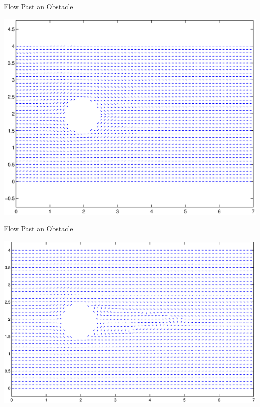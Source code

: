 \documentclass[frames]{prosper}
\begin{document}
\begin{slide}[Dissolve]{Flow Past an Obstacle}
\begin{center}
\includegraphics[scale = .4]{circle}
\end{center}
\end{slide}

\begin{slide}[Dissolve]{Flow Past an Obstacle}
\begin{center}
\includegraphics[scale = .4]{circle100}
\end{center}
\end{slide}
\end{document}
